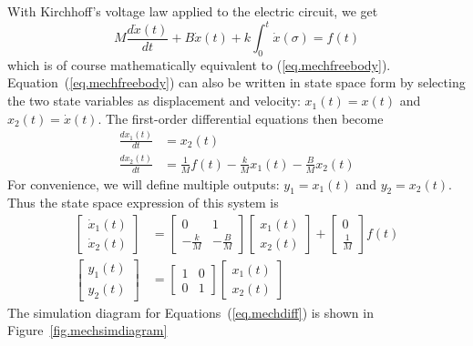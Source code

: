 With Kirchhoff's voltage law applied to the electric circuit, we get
\begin{equation}
    M\frac{d\dot{x}(t)}{dt} + B\dot{x}(t) + k\int_0^t \dot{x}(\sigma) = f(t)
\end{equation}
which is of course mathematically equivalent to (\ref{eq.mechfreebody}).  Equation~(\ref{eq.mechfreebody}) can also be written in state space form by selecting the two state variables as displacement and velocity: $x_1(t)=x(t)$ and $x_2(t) = \dot{x}(t)$.  The first-order differential equations then become
\begin{equation} \label{eq.mechdiff}
\begin{split}
    \frac{dx_1(t)}{dt} & = x_2(t) \\
    \frac{dx_2(t)}{dt} & = \frac{1}{M}f(t) - \frac{k}{M}x_1(t) - \frac{B}{M}x_2(t)
\end{split}
\end{equation}
For convenience, we will define multiple outputs: $y_1 = x_1(t)$ and $y_2 = x_2(t)$.  Thus the state space expression of this system is
\begin{equation}
\begin{split}
    \left[ \begin{array}{c} \dot{x}_1(t) \\ \dot{x}_2(t) \end{array} \right]
    & =
    \left[ \begin{array}{cc} 0 & 1 \\ -\frac{k}{M} & -\frac{B}{M} \end{array}
        \right]
    \left[ \begin{array}{c} x_1(t) \\ x_2(t) \end{array} \right]
    +
    \left[ \begin{array}{c} 0\\ \frac{1}{M} \end{array} \right]
    f(t)
    \\
    \left[ \begin{array}{c} y_1(t) \\ y_2(t) \end{array} \right]
    & =
    \left[ \begin{array}{cc} 1&0\\0&1 \end{array} \right]
    \left[ \begin{array}{c} x_1(t) \\ x_2(t) \end{array} \right]
\end{split}
\end{equation}
The simulation diagram for Equations~(\ref{eq.mechdiff}) is shown in Figure~\ref{fig.mechsimdiagram}

